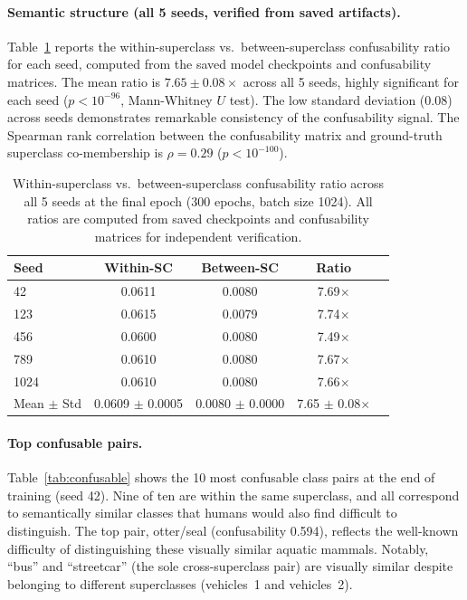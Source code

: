 \documentclass{article}
\begin{document}
\paragraph{Semantic structure (all 5 seeds, verified from saved artifacts).} Table~\ref{tab:conf_seeds} reports the within-superclass vs.\ between-superclass confusability ratio for each seed, computed from the saved model checkpoints and confusability matrices. The mean ratio is $7.65 \pm 0.08\times$ across all 5 seeds, highly significant for each seed ($p < 10^{-96}$, Mann-Whitney $U$ test). The low standard deviation ($0.08$) across seeds demonstrates remarkable consistency of the confusability signal. The Spearman rank correlation between the confusability matrix and ground-truth superclass co-membership is $\rho = 0.29$ ($p < 10^{-100}$).

\begin{table}[t]
\caption{Within-superclass vs.\ between-superclass confusability ratio across all 5 seeds at the final epoch (300 epochs, batch size 1024). All ratios are computed from saved checkpoints and confusability matrices for independent verification.}
\label{tab:conf_seeds}
\centering
\begin{tabular}{lcccc}
\toprule
Seed & Within-SC & Between-SC & Ratio \\
\midrule
42 & 0.0611 & 0.0080 & 7.69$\times$ \\
123 & 0.0615 & 0.0079 & 7.74$\times$ \\
456 & 0.0600 & 0.0080 & 7.49$\times$ \\
789 & 0.0610 & 0.0080 & 7.67$\times$ \\
1024 & 0.0610 & 0.0080 & 7.66$\times$ \\
\midrule
Mean $\pm$ Std &  0.0609 $\pm$ 0.0005 & 0.0080 $\pm$ 0.0000 & 7.65 $\pm$ 0.08$\times$ \\
\bottomrule
\end{tabular}
\end{table}

\paragraph{Top confusable pairs.} Table~\ref{tab:confusable} shows the 10 most confusable class pairs at the end of training (seed 42). Nine of ten are within the same superclass, and all correspond to semantically similar classes that humans would also find difficult to distinguish. The top pair, otter/seal (confusability 0.594), reflects the well-known difficulty of distinguishing these visually similar aquatic mammals. Notably, ``bus'' and ``streetcar'' (the sole cross-superclass pair) are visually similar despite belonging to different superclasses (vehicles~1 and vehicles~2).
\end{document}
